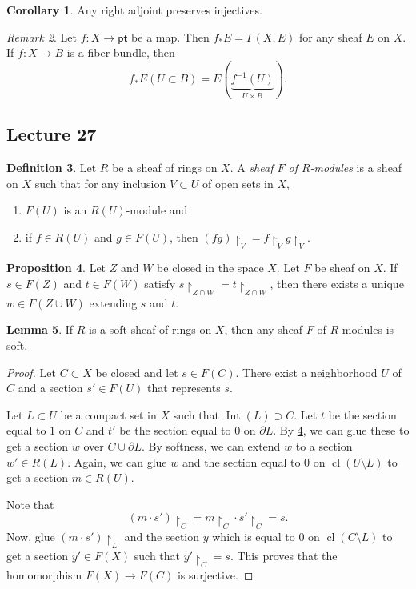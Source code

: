 \documentclass[10pt,letterpaper,cm]{nupset}
\theoremstyle{definition}
\newtheorem{definition}{Definition}[subsection]
\theoremstyle{theorem}
\newtheorem{lemma}[definition]{Lemma}
\newtheorem{prop}[definition]{Proposition}
\newtheorem{corollary}[definition]{Corollary}
\theoremstyle{remark}
\newtheorem{remark}[definition]{Remark}
\newcommand{\1}{\mathbb{1}}
\newcommand{\0}{\vec 0}
\newcommand{\pt}{\mathsf{pt}}
\DeclareMathOperator{\Int}{Int}
\DeclareMathOperator{\cl}{cl}
\begin{document}
\begin{corollary}
Any right adjoint preserves injectives. 
\end{corollary}

\smallskip

\begin{remark}
Let $f : X \to \pt$ be a map. Then $f_{\ast}{E} = \Gamma(X, E)$ for any sheaf $E$ on $X$. If $f : X \to B$ is a fiber bundle, then $$f_{\ast}{E}(U \subset B) = E(\underbrace{f^{-1}(U)}_{U \times B}).$$
\end{remark}

\subsection{Lecture 27}

\begin{definition}
Let $R$ be a sheaf of rings on $X$. A \textit{sheaf  $F$ of $R$-modules} is a sheaf on $X$ such that for any inclusion $V \subset U$ of open sets in $X$, 
\begin{enumerate}[label=(\roman*)]
\item $F(U)$ is an $R(U)$-module and
\item if $f \in R(U)$ and $g \in F(U)$, then $(fg)\restriction_V = f\restriction_V g\restriction_V$.
\end{enumerate}
\end{definition}


\begin{prop}\label{p2}
Let $Z$ and $W$ be closed in the space $X$. Let $F$ be sheaf on $X$. If $s\in F(Z)$ and $t \in F(W)$ satisfy $s \restriction_{Z \cap W} = t \restriction_{Z \cap W}$, then there exists a unique $w \in F(Z \cup W)$ extending $s$ and $t$.
\end{prop}

\begin{lemma}
If $R$ is a soft sheaf of rings on $X$, then any sheaf $F$ of $R$-modules is soft.
\end{lemma}
\begin{proof}
Let $C \subset X$ be closed and let $s \in F(C)$. There exist a neighborhood $U$ of $C$ and a section $s' \in F(U)$ that represents $s$. 

\medskip


Let $L\subset U$ be a compact set in $X$ such that $\Int(L) \supset C$. Let $t$ be the section equal to $1$ on $C$ and $t'$ be the section equal to $0$ on $\partial{L}$. By \cref{p2}, we can glue these to get a section $w$ over $C \cup \partial{L}$. By softness, we can extend $w$ to a section $w' \in R(L)$. Again, we can glue $w$ and the section equal to $0$ on $\cl(U \setminus L)$ to get a section $m\in R(U)$. 

\medskip

 Note that $$\left(m \cdot s'\right) \restriction_C = m \restriction_C \cdot s' \restriction_C = s .$$ Now, glue $(m \cdot s') \restriction_L$ and the section $y$ which is equal to $0$ on $\cl(C \setminus L)$ to get a section $y'\in F(X)$ such that $y'\restriction_C = s$. This proves that the homomorphism $F(X) \to F(C)$ is surjective. 
\end{proof}
\end{document}
